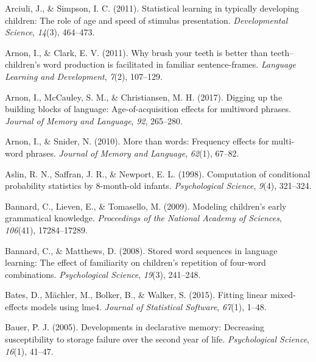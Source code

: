 \documentclass[
  english,
  man,mask,floatsintext]{apa6}
\begin{document}
\begingroup
\setlength{\parindent}{-0.5in}
\setlength{\leftskip}{0.5in}

\hypertarget{refs}{}
\leavevmode\hypertarget{ref-arciuli2011statistical}{}%
Arciuli, J., \& Simpson, I. C. (2011). Statistical learning in typically developing children: The role of age and speed of stimulus presentation. \emph{Developmental Science}, \emph{14}(3), 464--473.

\leavevmode\hypertarget{ref-arnon2011brush}{}%
Arnon, I., \& Clark, E. V. (2011). Why brush your teeth is better than teeth--children's word production is facilitated in familiar sentence-frames. \emph{Language Learning and Development}, \emph{7}(2), 107--129.

\leavevmode\hypertarget{ref-arnon2017}{}%
Arnon, I., McCauley, S. M., \& Christiansen, M. H. (2017). Digging up the building blocks of language: Age-of-acquisition effects for multiword phrases. \emph{Journal of Memory and Language}, \emph{92}, 265--280.

\leavevmode\hypertarget{ref-arnon2010more}{}%
Arnon, I., \& Snider, N. (2010). More than words: Frequency effects for multi-word phrases. \emph{Journal of Memory and Language}, \emph{62}(1), 67--82.

\leavevmode\hypertarget{ref-aslin1998computation}{}%
Aslin, R. N., Saffran, J. R., \& Newport, E. L. (1998). Computation of conditional probability statistics by 8-month-old infants. \emph{Psychological Science}, \emph{9}(4), 321--324.

\leavevmode\hypertarget{ref-bannard2009modeling}{}%
Bannard, C., Lieven, E., \& Tomasello, M. (2009). Modeling children's early grammatical knowledge. \emph{Proceedings of the National Academy of Sciences}, \emph{106}(41), 17284--17289.

\leavevmode\hypertarget{ref-bannard2008stored}{}%
Bannard, C., \& Matthews, D. (2008). Stored word sequences in language learning: The effect of familiarity on children's repetition of four-word combinations. \emph{Psychological Science}, \emph{19}(3), 241--248.

\leavevmode\hypertarget{ref-lme4}{}%
Bates, D., Mächler, M., Bolker, B., \& Walker, S. (2015). Fitting linear mixed-effects models using lme4. \emph{Journal of Statistical Software}, \emph{67}(1), 1--48.

\leavevmode\hypertarget{ref-bauer2005developments}{}%
Bauer, P. J. (2005). Developments in declarative memory: Decreasing susceptibility to storage failure over the second year of life. \emph{Psychological Science}, \emph{16}(1), 41--47.
\end{document}
